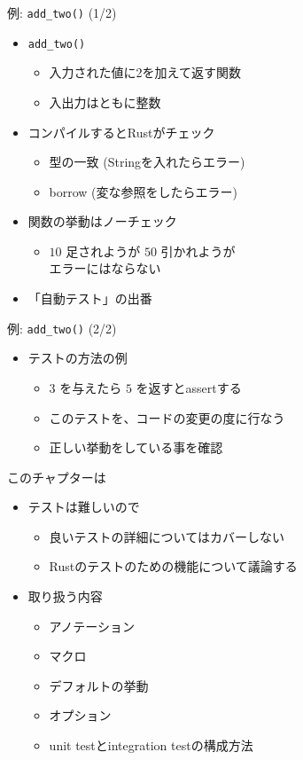 \documentclass[cjk,14pt,xcolor=dvipsnames,table,dvipdfmx,professional font,t,fragile]{beamer}
\begin{document}
\begin{frame}{例: \texttt{add\_two()} (1/2)}
 \begin{itemize}
  \item \texttt{add\_two()}
	\begin{itemize}
	 \item 入力された値に2を加えて返す関数
	 \item 入出力はともに整数
	\end{itemize}
  \item コンパイルするとRustがチェック
	\begin{itemize}
	 \item 型の一致 (Stringを入れたらエラー)
	 \item borrow (変な参照をしたらエラー)
	\end{itemize}
  \item 関数の挙動はノーチェック
	\begin{itemize}
	 \item $10$ 足されようが $50$ 引かれようが\\
	       エラーにはならない
	\end{itemize}
  \item 「自動テスト」の出番
 \end{itemize}
\end{frame}

\begin{frame}{例: \texttt{add\_two()} (2/2)}
 \begin{itemize}
  \item テストの方法の例
	\begin{itemize}
	 \item $3$ を与えたら $5$ を返すとassertする
	 \item このテストを、コードの変更の度に行なう
	 \item 正しい挙動をしている事を確認
	\end{itemize}
 \end{itemize}
\end{frame}

\begin{frame}{このチャプターは}
 \begin{itemize}
  \item テストは難しいので
	\begin{itemize}
	 \item 良いテストの詳細についてはカバーしない
	 \item Rustのテストのための機能について議論する
	\end{itemize}
  \item 取り扱う内容
	\begin{itemize}
	 \item アノテーション
	 \item マクロ
	 \item デフォルトの挙動
	 \item オプション
	 \item unit testとintegration testの構成方法
	\end{itemize}
 \end{itemize}
\end{frame}
\end{document}
